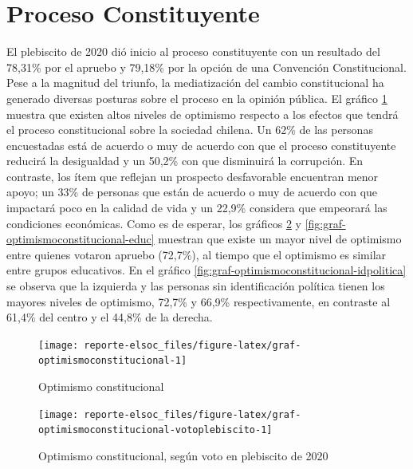 \documentclass[
  12pt,
]{book}
\begin{document}
\hypertarget{proceso-constituyente}{%
\section{Proceso Constituyente}\label{proceso-constituyente}}

El plebiscito de 2020 dió inicio al proceso constituyente con un resultado del 78,31\% por el apruebo y 79,18\% por la opción de una Convención Constitucional. Pese a la magnitud del triunfo, la mediatización del cambio constitucional ha generado diversas posturas sobre el proceso en la opinión pública. El gráfico \ref{fig:graf-optimismoconstitucional} muestra que existen altos niveles de optimismo respecto a los efectos que tendrá el proceso constitucional sobre la sociedad chilena. Un 62\% de las personas encuestadas está de acuerdo o muy de acuerdo con que el proceso constituyente reducirá la desigualdad y un 50,2\% con que disminuirá la corrupción. En contraste, los ítem que reflejan un prospecto desfavorable encuentran menor apoyo; un 33\% de personas que están de acuerdo o muy de acuerdo con que impactará poco en la calidad de vida y un 22,9\% considera que empeorará las condiciones económicas. Como es de esperar, los gráficos \ref{fig:graf-optimismoconstitucional-votoplebiscito} y \ref{fig:graf-optimismoconstitucional-educ} muestran que existe un mayor nivel de optimismo entre quienes votaron apruebo (72,7\%), al tiempo que el optimismo es similar entre grupos educativos. En el gráfico \ref{fig:graf-optimismoconstitucional-idpolitica} se observa que la izquierda y las personas sin identificación política tienen los mayores niveles de optimismo, 72,7\% y 66,9\% respectivamente, en contraste al 61,4\% del centro y el 44,8\% de la derecha.

\begin{figure}

{\centering \texttt{[image: reporte-elsoc\_files/figure-latex/graf-optimismoconstitucional-1]} 

}

\caption{Optimismo constitucional}\label{fig:graf-optimismoconstitucional}
\end{figure}

\begin{figure}

{\centering \texttt{[image: reporte-elsoc\_files/figure-latex/graf-optimismoconstitucional-votoplebiscito-1]} 

}

\caption{Optimismo constitucional, según voto en plebiscito de 2020}\label{fig:graf-optimismoconstitucional-votoplebiscito}
\end{figure}
\end{document}
